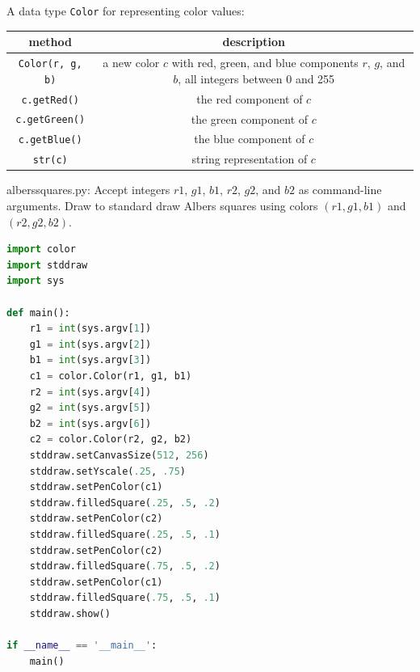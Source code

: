\documentclass[8pt,a4paper,compress,handout]{beamer}
\begin{document}
\begin{frame}[fragile]
A data type \lstinline{Color} for representing color values:
\begin{center}
\begin{tabular}{cc}
method & description \\ \hline
\lstinline$Color(r, g, b)$ & \makecell{a new color $c$ with red, green, and blue components \\ $r$, $g$, and $b$, all integers between 0 and 255} \\
\lstinline$c.getRed()$ & the red component of $c$ \\
\lstinline$c.getGreen()$ & the green component of $c$ \\
\lstinline$c.getBlue()$ & the blue component of $c$ \\
\lstinline$str(c)$ & string representation of $c$
\end{tabular} 
\end{center}
\end{frame}

\begin{frame}[fragile]
\begin{framed}
\tiny alberssquares.py: Accept integers $r1$, $g1$, $b1$, $r2$, $g2$, and $b2$ as command-line arguments. Draw to standard draw Albers squares using colors $(r1, g1, b1)$ and $(r2, g2, b2)$.
\end{framed}

\begin{lstlisting}[language=Python]
import color
import stddraw
import sys

def main():
    r1 = int(sys.argv[1])
    g1 = int(sys.argv[2])
    b1 = int(sys.argv[3])
    c1 = color.Color(r1, g1, b1)
    r2 = int(sys.argv[4])
    g2 = int(sys.argv[5])
    b2 = int(sys.argv[6])
    c2 = color.Color(r2, g2, b2)
    stddraw.setCanvasSize(512, 256)
    stddraw.setYscale(.25, .75)
    stddraw.setPenColor(c1)
    stddraw.filledSquare(.25, .5, .2)
    stddraw.setPenColor(c2)
    stddraw.filledSquare(.25, .5, .1)
    stddraw.setPenColor(c2)
    stddraw.filledSquare(.75, .5, .2)
    stddraw.setPenColor(c1)
    stddraw.filledSquare(.75, .5, .1)
    stddraw.show()

if __name__ == '__main__':
    main()
\end{lstlisting}
\end{frame}
\end{document}
